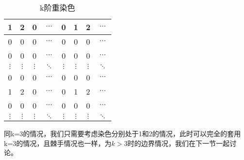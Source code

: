 \begin{table}[h]
	\centering
	\caption{k阶重染色}
	\begin{tabular}{|c|c|c|c|c|c|c|c|}
		\hline
		1        & 2        & 0        & $\cdots$ & 0        & 1        & 2        & $\cdots$ \\
		\hline
		0        & 0        & 0        & $\cdots$ & 0        & 0        & 0        & $\cdots$ \\
		\hline
		0        & 0        & 0        & $\cdots$ & 0        & 0        & 0        & $\cdots$ \\
		\hline
		$\vdots$ & $\vdots$ & $\vdots$ & $\ddots$ & $\vdots$ & $\vdots$ & $\vdots$ & $\ddots$ \\
		\hline
		0        & 0        & 0        & $\cdots$ & 0        & 0        & 0        & $\cdots$ \\
		\hline
		1        & 2        & 0        & $\cdots$ & 0        & 1        & 2        & $\cdots$ \\
		\hline
		0        & 0        & 0        & $\cdots$ & 0        & 0        & 0        & $\cdots$ \\
		\hline
		$\vdots$ & $\vdots$ & $\vdots$ & $\ddots$ & $\vdots$ & $\vdots$ & $\vdots$ & $\ddots$ \\
		\hline
	\end{tabular}
	\label{fig:k-order-staining-last}
\end{table}

同k=3的情况，我们只需要考虑染色分别处于1和2的情况，此时可以完全的套用k=3的情况，且棘手情况也一样，为$k>3$时的边界情况，我们在下一节一起讨论。

\clearpage